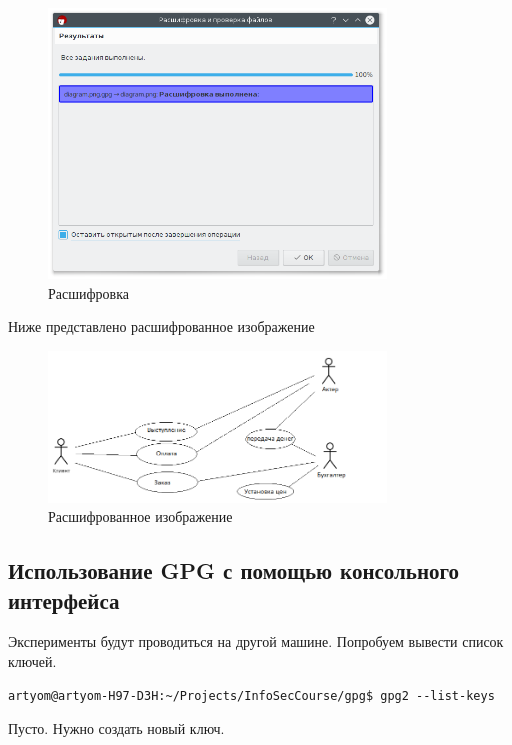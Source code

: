 \begin{figure}[H]
	\centering
	\includegraphics[width=0.8\textwidth]{figures/screen16.png}
	\caption{Расшифровка}
\end{figure}

Ниже представлено расшифрованное изображение

\begin{figure}[H]
	\centering
	\includegraphics[width=0.8\textwidth]{figures/diagram.png}
	\caption{Расшифрованное изображение}
\end{figure}

\subsection{Использование GPG с помощью консольного интерфейса}

Эксперименты будут проводиться на другой машине. Попробуем вывести список ключей.

\begin{verbatim}  
artyom@artyom-H97-D3H:~/Projects/InfoSecCourse/gpg$ gpg2 --list-keys
\end{verbatim}

Пусто. Нужно создать новый ключ.

